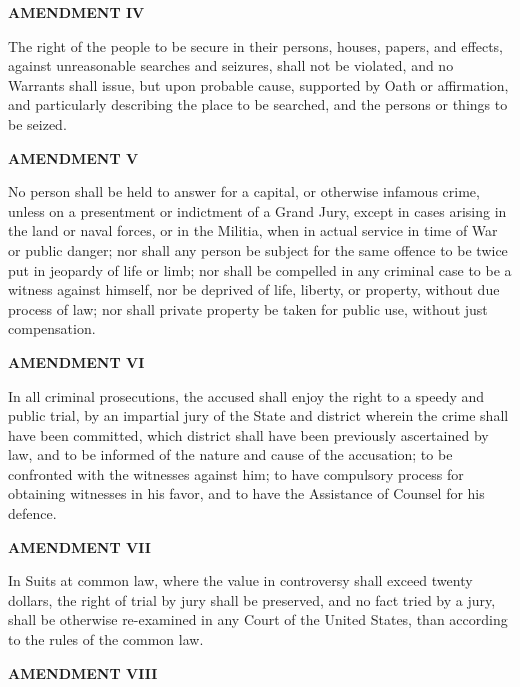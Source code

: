 \begin{center} \textbf{AMENDMENT IV} \end{center} 

The right of the people to be secure in their persons, houses, papers, and effects, against unreasonable searches and seizures, shall not be violated, and no Warrants shall issue, but upon probable cause, supported by Oath or affirmation, and particularly describing the place to be searched, and the persons or things to be seized.

\begin{center} \textbf{AMENDMENT V} \end{center} 

No person shall be held to answer for a capital, or otherwise infamous crime, unless on a presentment or indictment of a Grand Jury, except in cases arising in the land or naval forces, or in the Militia, when in actual service in time of War or public danger; nor shall any person be subject for the same offence to be twice put in jeopardy of life or limb; nor shall be compelled in any criminal case to be a witness against himself, nor be deprived of life, liberty, or property, without due process of law; nor shall private property be taken for public use, without just compensation.

\begin{center} \textbf{AMENDMENT VI} \end{center} 

In all criminal prosecutions, the accused shall enjoy the right to a speedy and public trial, by an impartial jury of the State and district wherein the crime shall have been committed, which district shall have been previously ascertained by law, and to be informed of the nature and cause of the accusation; to be confronted with the witnesses against him; to have compulsory process for obtaining witnesses in his favor, and to have the Assistance of Counsel for his defence.

\begin{center} \textbf{AMENDMENT VII} \end{center} 

In Suits at common law, where the value in controversy shall exceed twenty dollars, the right of trial by jury shall be preserved, and no fact tried by a jury, shall be otherwise re-examined in any Court of the United States, than according to the rules of the common law.

\begin{center} \textbf{AMENDMENT VIII} \end{center} 

